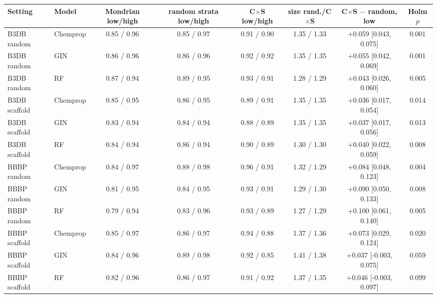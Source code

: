 \begin{tabular}{llcccccc}
\toprule
Setting & Model & Mondrian low/high & random strata low/high & C$\times$S low/high & size rand./C$\times$S & C$\times$S $-$ random, low & Holm $p$\\
\midrule
B3DB random & Chemprop & 0.85 / 0.96 & 0.85 / 0.97 & 0.91 / 0.90 & 1.35 / 1.33 & +0.059 [0.043, 0.075] & 0.001\\
B3DB random & GIN & 0.86 / 0.96 & 0.86 / 0.96 & 0.92 / 0.92 & 1.35 / 1.35 & +0.055 [0.042, 0.069] & 0.001\\
B3DB random & RF & 0.87 / 0.94 & 0.89 / 0.95 & 0.93 / 0.91 & 1.28 / 1.29 & +0.043 [0.026, 0.060] & 0.005\\
B3DB scaffold & Chemprop & 0.85 / 0.95 & 0.86 / 0.95 & 0.89 / 0.91 & 1.35 / 1.35 & +0.036 [0.017, 0.054] & 0.014\\
B3DB scaffold & GIN & 0.83 / 0.94 & 0.84 / 0.94 & 0.88 / 0.89 & 1.35 / 1.35 & +0.037 [0.017, 0.056] & 0.013\\
B3DB scaffold & RF & 0.84 / 0.94 & 0.86 / 0.94 & 0.90 / 0.89 & 1.30 / 1.30 & +0.040 [0.022, 0.059] & 0.008\\
BBBP random & Chemprop & 0.84 / 0.97 & 0.88 / 0.98 & 0.96 / 0.91 & 1.32 / 1.29 & +0.084 [0.048, 0.123] & 0.004\\
BBBP random & GIN & 0.81 / 0.95 & 0.84 / 0.95 & 0.93 / 0.91 & 1.29 / 1.30 & +0.090 [0.050, 0.133] & 0.008\\
BBBP random & RF & 0.79 / 0.94 & 0.83 / 0.96 & 0.93 / 0.89 & 1.27 / 1.29 & +0.100 [0.061, 0.140] & 0.005\\
BBBP scaffold & Chemprop & 0.85 / 0.97 & 0.86 / 0.97 & 0.94 / 0.88 & 1.37 / 1.36 & +0.073 [0.029, 0.124] & 0.020\\
BBBP scaffold & GIN & 0.84 / 0.96 & 0.89 / 0.98 & 0.92 / 0.85 & 1.41 / 1.38 & +0.037 [-0.003, 0.075] & 0.059\\
BBBP scaffold & RF & 0.82 / 0.96 & 0.86 / 0.97 & 0.91 / 0.92 & 1.37 / 1.35 & +0.046 [-0.003, 0.097] & 0.099\\
\bottomrule
\end{tabular}
